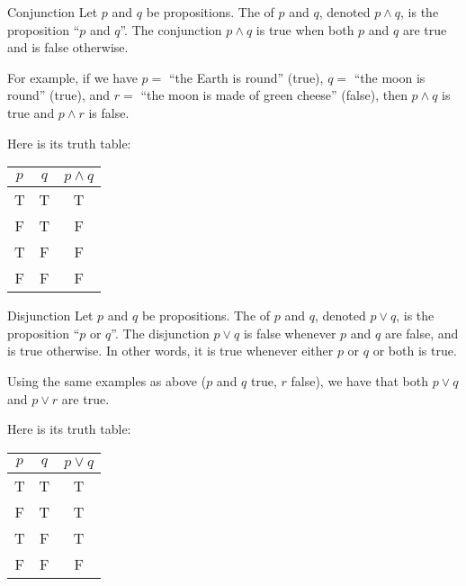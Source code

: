 \documentclass{article}
\begin{document}
\begin{parag}{Conjunction}
    Let $p$ and $q$ be propositions. The  of $p$ and $q$, denoted $p \land q$, is the proposition ``$p$ and $q$''. The conjunction $p \land q$ is true when both $p$ and $q$ are true and is false otherwise.

    For example, if we have $p = $ ``the Earth is round'' (true), $q = $ ``the moon is round'' (true), and $r = $ ``the moon is made of green cheese'' (false), then $p \land q$ is true and $p \land r$ is false.

    Here is its truth table:
    \begin{center}
    \begin{tabular}{c|c|c}
        $p$ & $q$ & $p \land q$ \\
        \hline
        T & T & T \\
        F & T & F \\
        T & F & F \\
        F & F & F 
    \end{tabular}
    \end{center}
\end{parag}

\begin{parag}{Disjunction}
    Let $p$ and $q$ be propositions. The  of $p$ and $q$, denoted $p \lor q$, is the proposition ``$p$ or $q$''. The disjunction $p \lor q$ is false whenever $p$ and $q$ are false, and is true otherwise. In other words, it is true whenever either $p$ or $q$ or both is true.

    Using the same examples as above ($p$ and $q$ true, $r$ false), we have that both $p \lor q$ and $p \lor r$ are true.

    Here is its truth table:
    \begin{center}
    \begin{tabular}{c|c|c}
        $p$ & $q$ & $p \lor q$  \\
        \hline
        T & T & T \\
        F & T & T \\
        T & F & T \\
        F & F & F
    \end{tabular}
    \end{center}
\end{parag}
\end{document}

